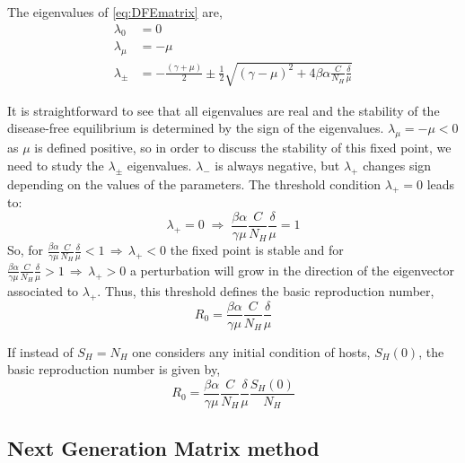 The eigenvalues of \cref{eq:DFEmatrix} are,
\begin{equation}
    \begin{split}
        \lambda_0 &= 0 \\
        \lambda_\mu &= -\mu \\
        \lambda_{\pm} &= -\frac{(\gamma+\mu)}{2} \pm
        \frac{1}{2}\sqrt{ (\gamma-\mu)^2 +4\beta \alpha
            \frac{C}{N_H}\frac{\delta}{\mu}
        }
    \end{split}
\end{equation}

It is straightforward to see that all eigenvalues are real and
the stability of the disease-free equilibrium is determined by the sign of the
eigenvalues. $\lambda_\mu = -\mu <0$ as $\mu$ is defined positive, so  in order
to discuss the stability of this fixed point, we need to study the
$\lambda_{\pm}$ eigenvalues. $\lambda_{-}$ is always negative, but
$\lambda_{+}$ changes sign depending on the values of the parameters. The
threshold condition $\lambda_{+} = 0$ leads to:
\begin{equation}
    \lambda_{+} = 0 \; \Rightarrow \; \frac{\beta
        \alpha}{\gamma \mu} \frac{C}{N_H}\frac{\delta}{\mu} = 1
    \label{eq:lambda+_general}
\end{equation}
So, for $\displaystyle\frac{\beta \alpha}{\gamma \mu}
    \frac{C}{N_H}\frac{\delta}{\mu}<1 \, \Rightarrow \, \lambda_{+} < 0 $ the
fixed
point is stable and for $\displaystyle\frac{\beta \alpha}{\gamma \mu}
    \frac{C}{N_H}\frac{\delta}{\mu} >1 \, \Rightarrow \, \lambda_{+} > 0 $ a
perturbation will grow in the direction of the eigenvector associated to
$\lambda_{+}$. Thus, this threshold defines the basic reproduction number,
\begin{equation}
    R_0 = \frac{\beta \alpha}{\gamma
        \mu}\frac{C}{N_H}\frac{\delta}{\mu}
\end{equation}

If instead of $S_H=N_H$ one considers any initial condition of
hosts, $S_H(0)$, the basic reproduction number is given by,
\begin{equation}
    R_0 = \frac{\beta \alpha}{\gamma
        \mu}\frac{C}{N_H}\frac{\delta}{\mu}\frac{S_H(0)}{N_H}
\end{equation}

\subsection*{Next Generation Matrix method}

